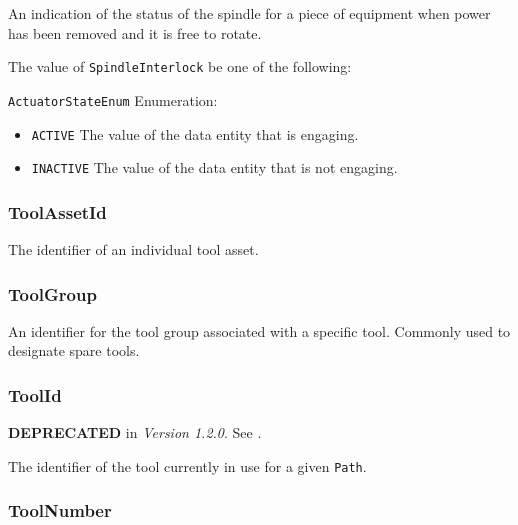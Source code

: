 An indication of the status of the spindle for a piece of equipment when power has been removed and it is free to rotate.


The value of \texttt{SpindleInterlock} \MUST be one of the following: 


\texttt{ActuatorStateEnum} Enumeration:

\begin{itemize}
\item \texttt{ACTIVE} \newline The value of the \gls{data entity} that is engaging. 
\item \texttt{INACTIVE} \newline The value of the \gls{data entity} that is not engaging. 
\end{itemize}



\subsubsection{ToolAssetId}
\label{sec:ToolAssetId}



The identifier of an individual tool asset.



\subsubsection{ToolGroup}
\label{sec:ToolGroup}



An identifier for the tool group associated with a specific tool. Commonly used to designate spare tools.



\subsubsection{ToolId}
\label{sec:ToolId}



\textbf{DEPRECATED} in \textit{Version 1.2.0}.   See .

The identifier of the tool currently in use for a given \texttt{Path}.



\subsubsection{ToolNumber}
\label{sec:ToolNumber}



